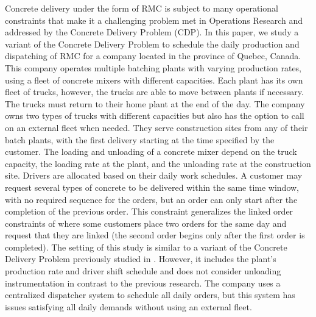 \documentclass{article}
\begin{document}
Concrete delivery under the form of RMC is subject to many operational constraints that make it a challenging problem met in Operations Research and addressed by the Concrete Delivery Problem (CDP). In this paper, we study a variant of the Concrete Delivery Problem to schedule the daily production and dispatching of RMC for a company located in the province of Quebec, Canada. This company operates multiple batching plants with varying production rates, using a fleet of concrete mixers with different capacities. Each plant has its own fleet of trucks, however, the trucks are able to move between plants if necessary. The trucks must return to their home plant at the end of the day. The company owns two types of trucks with different capacities but also has the option to call on an external fleet when needed. They serve construction sites from any of their batch plants, with the first delivery starting at the time specified by the customer. The loading and unloading of a concrete mixer depend on the truck capacity, the loading rate at the plant, and the unloading rate at the construction site. Drivers are allocated based on their daily work schedules. A customer may request several types of concrete to be delivered within the same time window, with no required sequence for the orders, but an order can only start after the completion of the previous order. This constraint generalizes the linked order constraints of \cite{durbin2008or} where some customers place two orders for the same day and request that they are linked (the second order begins only after the first order is completed). The setting of this study is similar to a variant of the Concrete Delivery Problem previously studied in \cite{schmid2009hybrid, schmid2010hybridization}. However, it includes the plant's production rate and driver shift schedule and does not consider unloading instrumentation in contrast to the previous research.
The company uses a centralized dispatcher system to schedule all daily orders, but this system has issues satisfying all daily demands without using an external fleet.
\end{document}
